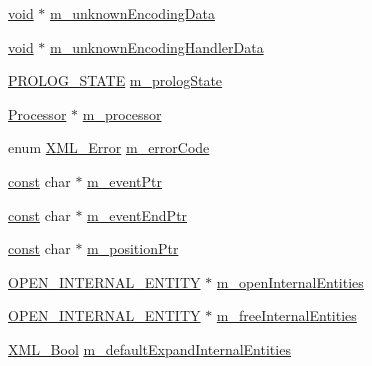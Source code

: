 \begin{DoxyCompactItemize}
\item 
\hyperlink{struct_x_m_l___parser_struct_a3cf000bdbc145bf39b502cd6ba0b6bc7}{void} $\ast$ \hyperlink{struct_x_m_l___parser_struct_a558056248c8ec74e08fc432a3b562cea}{m\+\_\+unknown\+Encoding\+Data}
\item 
\hyperlink{struct_x_m_l___parser_struct_a3cf000bdbc145bf39b502cd6ba0b6bc7}{void} $\ast$ \hyperlink{struct_x_m_l___parser_struct_a43c2012cd5bd7e22e9d3c5e2904cea8e}{m\+\_\+unknown\+Encoding\+Handler\+Data}
\item 
\hyperlink{xmlrole_8h_a2b4e16b088459562d6666e0cf5e3fb4e}{P\+R\+O\+L\+O\+G\+\_\+\+S\+T\+A\+TE} \hyperlink{struct_x_m_l___parser_struct_ae497d6f82f3d625a868026574a4be9dd}{m\+\_\+prolog\+State}
\item 
\hyperlink{xmlparse_8c_a91ac003478582480fcfc8c0fd9377cbc}{Processor} $\ast$ \hyperlink{struct_x_m_l___parser_struct_ab1e442efae09f2a9569839d1a7e8beac}{m\+\_\+processor}
\item 
enum \hyperlink{amiga_2include_2libraries_2expat_8h_a6a06dad2fbbc37dd288c51e577494118}{X\+M\+L\+\_\+\+Error} \hyperlink{struct_x_m_l___parser_struct_a24184b88b08de9e47ef75a7eefd71b87}{m\+\_\+error\+Code}
\item 
\hyperlink{getopt1_8c_a2c212835823e3c54a8ab6d95c652660e}{const} char $\ast$ \hyperlink{struct_x_m_l___parser_struct_aea08b96f41ce29438d0de87213341ab0}{m\+\_\+event\+Ptr}
\item 
\hyperlink{getopt1_8c_a2c212835823e3c54a8ab6d95c652660e}{const} char $\ast$ \hyperlink{struct_x_m_l___parser_struct_a296d83372851837d879d27c8e36ce95d}{m\+\_\+event\+End\+Ptr}
\item 
\hyperlink{getopt1_8c_a2c212835823e3c54a8ab6d95c652660e}{const} char $\ast$ \hyperlink{struct_x_m_l___parser_struct_adbdca8607edf1f9fce1b20c4d1f812ff}{m\+\_\+position\+Ptr}
\item 
\hyperlink{xmlparse_8c_a3cd960f4356314fc70dbef66f990d596}{O\+P\+E\+N\+\_\+\+I\+N\+T\+E\+R\+N\+A\+L\+\_\+\+E\+N\+T\+I\+TY} $\ast$ \hyperlink{struct_x_m_l___parser_struct_a9bc8d391b98a1ad49bbe3690897e6564}{m\+\_\+open\+Internal\+Entities}
\item 
\hyperlink{xmlparse_8c_a3cd960f4356314fc70dbef66f990d596}{O\+P\+E\+N\+\_\+\+I\+N\+T\+E\+R\+N\+A\+L\+\_\+\+E\+N\+T\+I\+TY} $\ast$ \hyperlink{struct_x_m_l___parser_struct_a9747a1bc68e7999012bb80f9c2d3bc2e}{m\+\_\+free\+Internal\+Entities}
\item 
\hyperlink{amiga_2include_2libraries_2expat_8h_a5fe41bca8b7a23b2405f1b967e70f33a}{X\+M\+L\+\_\+\+Bool} \hyperlink{struct_x_m_l___parser_struct_a271e1d18ff50a88d80059cf7f3f967ad}{m\+\_\+default\+Expand\+Internal\+Entities}

\end{DoxyCompactItemize}

